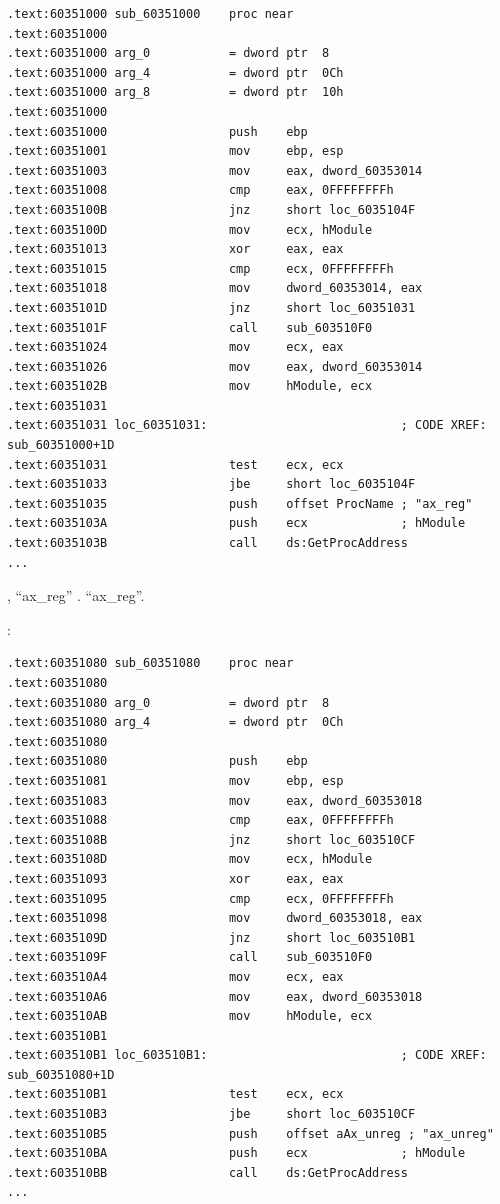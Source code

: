 \begin{lstlisting}
.text:60351000 sub_60351000    proc near
.text:60351000
.text:60351000 arg_0           = dword ptr  8
.text:60351000 arg_4           = dword ptr  0Ch
.text:60351000 arg_8           = dword ptr  10h
.text:60351000
.text:60351000                 push    ebp
.text:60351001                 mov     ebp, esp
.text:60351003                 mov     eax, dword_60353014
.text:60351008                 cmp     eax, 0FFFFFFFFh
.text:6035100B                 jnz     short loc_6035104F
.text:6035100D                 mov     ecx, hModule
.text:60351013                 xor     eax, eax
.text:60351015                 cmp     ecx, 0FFFFFFFFh
.text:60351018                 mov     dword_60353014, eax
.text:6035101D                 jnz     short loc_60351031
.text:6035101F                 call    sub_603510F0
.text:60351024                 mov     ecx, eax
.text:60351026                 mov     eax, dword_60353014
.text:6035102B                 mov     hModule, ecx
.text:60351031
.text:60351031 loc_60351031:                           ; CODE XREF: sub_60351000+1D
.text:60351031                 test    ecx, ecx
.text:60351033                 jbe     short loc_6035104F
.text:60351035                 push    offset ProcName ; "ax_reg"
.text:6035103A                 push    ecx             ; hModule
.text:6035103B                 call    ds:GetProcAddress
...
\end{lstlisting}

, ``ax\_reg'' . 
 ``ax\_reg''.

:

\begin{lstlisting}
.text:60351080 sub_60351080    proc near
.text:60351080
.text:60351080 arg_0           = dword ptr  8
.text:60351080 arg_4           = dword ptr  0Ch
.text:60351080
.text:60351080                 push    ebp
.text:60351081                 mov     ebp, esp
.text:60351083                 mov     eax, dword_60353018
.text:60351088                 cmp     eax, 0FFFFFFFFh
.text:6035108B                 jnz     short loc_603510CF
.text:6035108D                 mov     ecx, hModule
.text:60351093                 xor     eax, eax
.text:60351095                 cmp     ecx, 0FFFFFFFFh
.text:60351098                 mov     dword_60353018, eax
.text:6035109D                 jnz     short loc_603510B1
.text:6035109F                 call    sub_603510F0
.text:603510A4                 mov     ecx, eax
.text:603510A6                 mov     eax, dword_60353018
.text:603510AB                 mov     hModule, ecx
.text:603510B1
.text:603510B1 loc_603510B1:                           ; CODE XREF: sub_60351080+1D
.text:603510B1                 test    ecx, ecx
.text:603510B3                 jbe     short loc_603510CF
.text:603510B5                 push    offset aAx_unreg ; "ax_unreg"
.text:603510BA                 push    ecx             ; hModule
.text:603510BB                 call    ds:GetProcAddress
...
\end{lstlisting}

